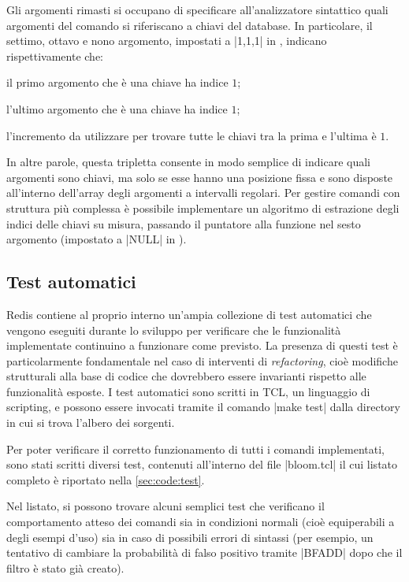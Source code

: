 Gli argomenti rimasti si occupano di specificare all'analizzatore sintattico quali argomenti del
comando si riferiscano a chiavi del database. In particolare, il settimo, ottavo e nono argomento, 
impostati a \cverb|1,1,1| in , indicano rispettivamente che: 

\begin{enumerate*}[label={(\alph*)}]
  \item il primo argomento che è una chiave ha indice $1$; 
  \item l'ultimo argomento che è una chiave ha indice $1$;
  \item l'incremento da utilizzare per trovare tutte le chiavi tra la prima e l'ultima è $1$. 
\end{enumerate*}

In altre parole, questa tripletta consente in modo semplice di indicare quali argomenti sono chiavi,
ma solo se esse hanno una posizione fissa e sono disposte all'interno dell'array degli argomenti a
intervalli regolari. Per gestire comandi con struttura più complessa è possibile implementare un
algoritmo di estrazione degli indici delle chiavi su misura, passando il puntatore alla funzione nel
sesto argomento (impostato a \cverb|NULL| in ).

\subsection{Test automatici}

Redis contiene al proprio interno un'ampia collezione di test automatici che vengono eseguiti
durante lo sviluppo per verificare che le funzionalità implementate continuino a funzionare come
previsto. La presenza di questi test è particolarmente fondamentale nel caso di interventi di
\emph{refactoring}, cioè modifiche strutturali alla base di codice che dovrebbero essere invarianti
rispetto alle funzionalità esposte. I test automatici sono scritti in TCL, un linguaggio di
scripting, e possono essere invocati tramite il comando \cverb|make test| dalla directory in cui
si trova l'albero dei sorgenti.

Per poter verificare il corretto funzionamento di tutti i comandi implementati, sono stati
scritti diversi test, contenuti all'interno del file \cverb|bloom.tcl| il cui listato completo
è riportato nella \autoref{sec:code:test}. 

Nel listato, si possono trovare alcuni semplici test che verificano il comportamento atteso dei
comandi sia in condizioni normali (cioè equiperabili a degli esempi d'uso) sia in caso di possibili
errori di sintassi (per esempio, un tentativo di cambiare la probabilità di falso positivo tramite
\cverb|BFADD| dopo che il filtro è stato già creato).

